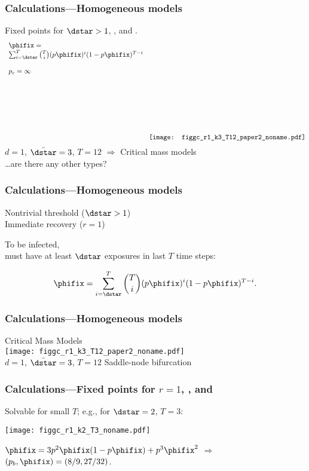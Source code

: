 
\begin{frame}
  \frametitle{Calculations---Homogeneous models}

  Fixed points for $\dstar > 1$, ,  and .\\
  $$
  \begin{array}{l}
  \phifix = \\
  \sum_{i=\dstar}^{T}
  \binom{T}{i}
  (p\phifix)^{i} (1 - p\phifix)^{T-i}\\
  \\
  p_c = \infty\\
  \end{array}
   \raisebox{-4cm}{
    \texttt{[image: figgc\_r1\_k3\_T12\_paper2\_noname.pdf]}}
  $$
  $d=1$, $\bar{\dstar}=3$, $T=12$ \hfill $\Rightarrow$ Critical mass models\\
  \hfill \ldots are there any other types?
  
\end{frame}

\begin{frame}
  \frametitle{Calculations---Homogeneous models}

   Nontrivial threshold ($\dstar > 1$) \\
   Immediate recovery ($r=1$)

  To be infected,\\ must have at least $\dstar$
  exposures in last $T$ time steps:

  $$
  \phifix = 
  \sum_{i=\dstar}^{T}
  \binom{T}{i}
  (p\phifix)^{i} (1 - p\phifix)^{T-i}.
  $$

\end{frame}

\begin{frame}
  \frametitle{Calculations---Homogeneous models}
  \centering
  Critical Mass Models\\
  \texttt{[image: figgc\_r1\_k3\_T12\_paper2\_noname.pdf]}\\
  $d=1$, $\bar{\dstar}=3$, $T=12$ \hfill Saddle-node bifurcation
  
\end{frame}


\begin{frame}
  \frametitle{Calculations---Fixed points for $r = 1$, , and }

  Solvable for small $T$; e.g., for $\dstar=2$, $T=3$:

  \texttt{[image: figgc\_r1\_k2\_T3\_noname.pdf]}

 $\phifix = 3 p^2 \phifix (1 - p \phifix) + p^3 \phifix^2$
 $\Rightarrow$ $(p_b,\phifix)=(8/9,27/32)$.

\end{frame}

